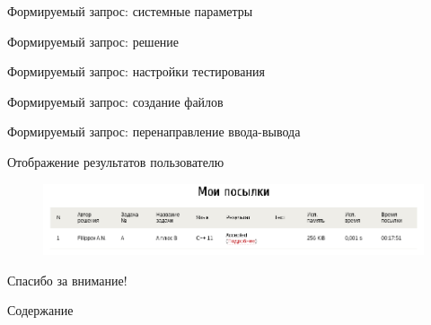 \documentclass[xetex,mathserif,serif,10pt]{beamer}
\begin{document}
    \begin{frame}{Формируемый запрос: системные параметры}
        
    \end{frame}

    \begin{frame}{Формируемый запрос: решение}
        
    \end{frame}

    \begin{frame}{Формируемый запрос: настройки тестирования}
        
    \end{frame}

    \begin{frame}{Формируемый запрос: создание файлов}
        
    \end{frame}

    \begin{frame}{Формируемый запрос: перенаправление ввода-вывода}
        
    \end{frame}

    \begin{frame}{Отображение результатов пользователю}
        \begin{figure}
            \centering
            \includegraphics[width=\columnwidth]{rs/mysubmitsok}
        \end{figure}
    \end{frame}

    \begin{frame}
        \Large\centering Спасибо за внимание!
    \end{frame}

    \begin{frame}{Содержание}
        \tableofcontents
    \end{frame}
\end{document}
